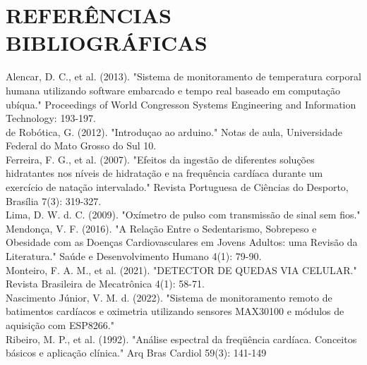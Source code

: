 \section*{REFERÊNCIAS BIBLIOGRÁFICAS}




\singlespacing 
\noindent Alencar, D. C., et al. (2013). "Sistema de monitoramento de temperatura corporal humana utilizando software embarcado e tempo real baseado em computação ubíqua." Proceedings of World Congresson Systems Engineering and Information Technology: 193-197.
\\

\singlespacing
\noindent de Robótica, G. (2012). "Introduçao ao arduino." Notas de aula, Universidade Federal do Mato Grosso do Sul 10.
\\

\noindent Ferreira, F. G., et al. (2007). "Efeitos da ingestão de diferentes soluções hidratantes nos níveis de hidratação e na frequência cardíaca durante um exercício de natação intervalado." Revista Portuguesa de Ciências do Desporto, Brasília 7(3): 319-327.
\\

\singlespacing
\noindent Lima, D. W. d. C. (2009). "Oxímetro de pulso com transmissão de sinal sem fios."
\\

\singlespacing
\noindent Mendonça, V. F. (2016). "A Relação Entre o Sedentarismo, Sobrepeso e Obesidade com as Doenças Cardiovasculares em Jovens Adultos: uma Revisão da Literatura." Saúde e Desenvolvimento Humano 4(1): 79-90.
\\

\singlespacing
\noindent Monteiro, F. A. M., et al. (2021). "DETECTOR DE QUEDAS VIA CELULAR." Revista Brasileira de Mecatrônica 4(1): 58-71.
\\

\singlespacing
\noindent Nascimento Júnior, V. M. d. (2022). "Sistema de monitoramento remoto de batimentos cardíacos e oximetria utilizando sensores MAX30100 e módulos de aquisição com ESP8266."
\\

\singlespacing
\noindent Ribeiro, M. P., et al. (1992). "Análise espectral da freqüência cardíaca. Conceitos básicos e aplicação clínica." Arq Bras Cardiol 59(3): 141-149
\\

